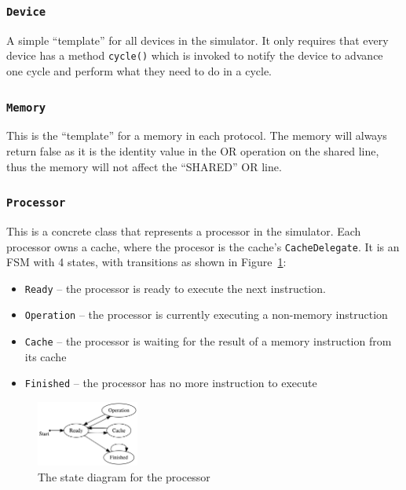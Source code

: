 \documentclass[nonacm,acmsmall,screen,11pt]{acmart}
\begin{document}
\subsubsection{\texttt{Device}}
A simple ``template'' for all devices in the simulator.
It only requires that every device has a method \texttt{cycle()} which is invoked to notify the device to advance one cycle and perform what they need to do in a cycle.

\subsubsection{\texttt{Memory}}
This is the ``template'' for a memory in each protocol.
The memory will always return false as it is the identity value in the OR operation on the shared line, thus the memory will not affect the ``SHARED'' OR line.

\subsubsection{\texttt{Processor}}
This is a concrete class that represents a processor in the simulator.
Each processor owns a cache, where the procesor is the cache's \texttt{CacheDelegate}.
It is an FSM with 4 states, with transitions as shown in Figure~\ref{fig:processor}:
\begin{itemize}
  \item \texttt{Ready} -- the processor is ready to execute the next instruction.
  \item \texttt{Operation} -- the processor is currently executing a non-memory instruction
  \item \texttt{Cache} -- the processor is waiting for the result of a memory instruction from its cache
  \item \texttt{Finished} -- the processor has no more instruction to execute
\end{itemize}

\begin{figure}[htb!]
  \centering
  \includegraphics[width=0.3\textwidth]{processor}
  \caption{The state diagram for the processor}
  \label{fig:processor}
\end{figure}
\end{document}
